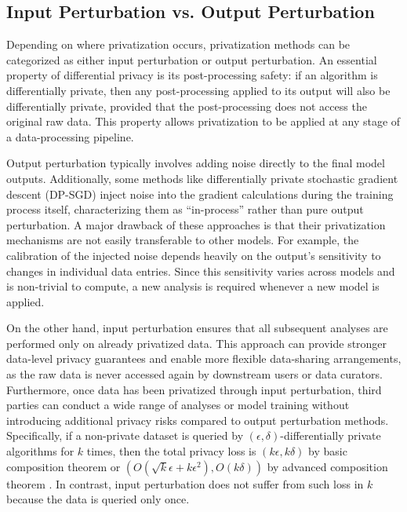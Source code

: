\documentclass[11pt]{article}
\begin{document}
\subsection{Input Perturbation vs. Output Perturbation}\label{sec:input-output}

Depending on where privatization occurs, privatization methods can be categorized as either input perturbation or output perturbation. An essential property of differential privacy is its post-processing safety: if an algorithm is differentially private, then any post-processing applied to its output will also be differentially private, provided that the post-processing does not access the original raw data. This property allows privatization to be applied at any stage of a data-processing pipeline. 

Output perturbation typically involves adding noise directly to the final model outputs. Additionally, some methods like differentially private stochastic gradient descent (DP-SGD) \citep{Abadi_2016} inject noise into the gradient calculations during the training process itself, characterizing them as ``in-process'' rather than pure output perturbation. A major drawback of these approaches is that their privatization mechanisms are not easily transferable to other models. For example, the calibration of the injected noise depends heavily on the output's sensitivity to changes in individual data entries. Since this sensitivity varies across models and is non-trivial to compute, a new analysis is required whenever a new model is applied.

On the other hand, input perturbation ensures that all subsequent analyses are performed only on already privatized data. This approach can provide stronger data-level privacy guarantees and enable more flexible data-sharing arrangements, as the raw data is never accessed again by downstream users or data curators. Furthermore, once data has been privatized through input perturbation, third parties can conduct a wide range of analyses or model training without introducing additional privacy risks compared to output perturbation methods. Specifically, if a non-private dataset is queried by $(\epsilon,\delta)$-differentially private algorithms for $k$ times, then the total privacy loss is $(k\epsilon,k\delta)$ by basic composition theorem or $(O(\sqrt{k}\epsilon+k\epsilon^2),O(k\delta))$ by advanced composition theorem \citep{DworkRoth}. In contrast, input perturbation does not suffer from such loss in $k$ because the data is queried only once.
\end{document}
